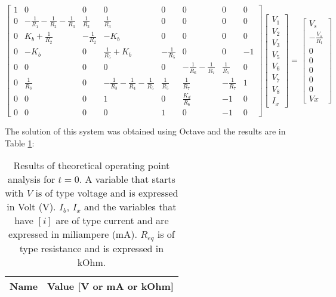 \begin{equation}
\begin{bmatrix}
1 & 0& 0& 0& 0& 0& 0& 0 \\ 
0 & -\frac{1}{R_{1}}-\frac{1}{R_{2}}-\frac{1}{R_{3}} & \frac{1}{R_{2}} & \frac{1}{R_{3}} & 0&  0& 0& 0\\ 
0 & K_{b}+\frac{1}{R_{2}} & -\frac{1}{R_{2}} & -K_{b} & 0 &  0& 0& 0\\ 
0 & -K_{b} & 0 & \frac{1}{R_{5}}+K_{b} & -\frac{1}{R_{5}} & 0& 0& -1 \\ 
0 & 0 &0  & 0 &0  & -\frac{1}{R_{6}}-\frac{1}{R_{7}} & \frac{1}{R_{7}} & 0 \\
0 & \frac{1}{R_{3}} &0  & -\frac{1}{R_{3}}-\frac{1}{R_{4}}-\frac{1}{R_{5}} & \frac{1}{R_{5}} & \frac{1}{R_{7}} & -\frac{1}{R_{7}} & 1\\ 
0 & 0 & 0 & 1 & 0 & \frac{K_{d}}{R_{6}} & -1 & 0 \\
0 & 0 & 0 & 0 & 1 & 0 & -1 & 0
\end{bmatrix}
\begin{bmatrix}
V_{1}\\ 
V_{2}\\ 
V_{3}\\ 
V_{5}\\ 
V_{6}\\ 
V_{7}\\ 
V_{8}\\
I_{x}
\end{bmatrix}
=
\begin{bmatrix}
V_{s}\\ 
-\frac{V_{s}}{R_{1}}\\ 
0\\ 
0\\ 
0\\ 
0\\ 
0\\
Vx
\end{bmatrix}
\end{equation}


The solution of this system was obtained using Octave and the results are in Table \ref{tab:nodal2}:

\begin{table}[H]
  \centering
  \begin{tabular}{|l|r|}
    \hline    
    {\bf Name} & {\bf Value [V or mA or kOhm]} \\ \hline
    
  \end{tabular}
  \caption{Results of theoretical operating point analysis for $t=0$. A variable that starts with $V$ is of type voltage and is expressed in Volt (V). $I_b$, $I_x$ and the variables that have $[i]$ are of type current and are expressed in miliampere (mA). $R_{eq}$ is of type resistance and is expressed in kOhm. }
  \label{tab:nodal2}
\end{table}

